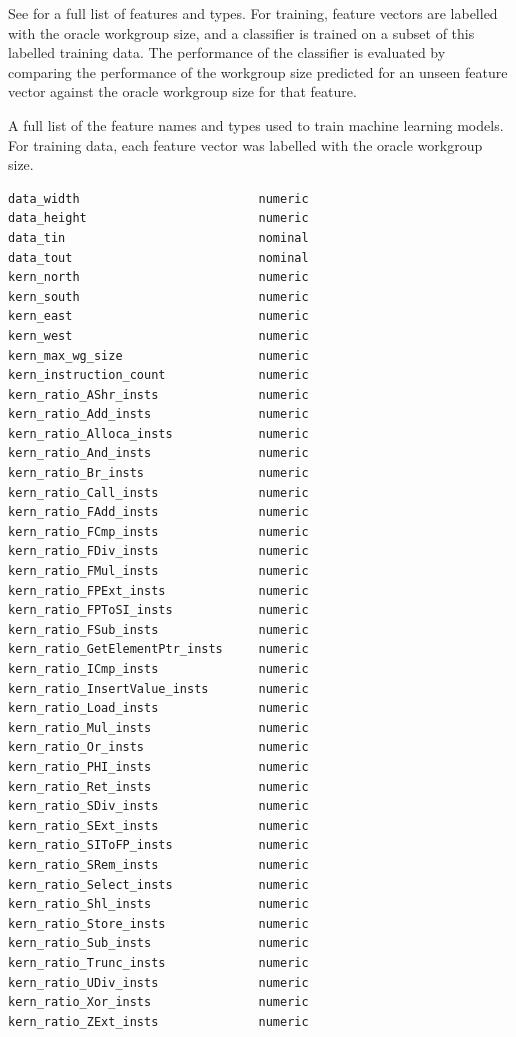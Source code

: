 See  for a full list of features and types. For
training, feature vectors are labelled with the oracle workgroup size,
and a classifier is trained on a subset of this labelled training
data. The performance of the classifier is evaluated by comparing the
performance of the workgroup size predicted for an unseen feature
vector against the oracle workgroup size for that feature.

A full list of the feature names and types used to train machine
learning models. For training data, each feature vector was labelled
with the oracle workgroup size.

\begin{multicols}{2}
\begin{Verbatim}[fontsize=\footnotesize]
data_width                         numeric
data_height                        numeric
data_tin                           nominal
data_tout                          nominal
kern_north                         numeric
kern_south                         numeric
kern_east                          numeric
kern_west                          numeric
kern_max_wg_size                   numeric
kern_instruction_count             numeric
kern_ratio_AShr_insts              numeric
kern_ratio_Add_insts               numeric
kern_ratio_Alloca_insts            numeric
kern_ratio_And_insts               numeric
kern_ratio_Br_insts                numeric
kern_ratio_Call_insts              numeric
kern_ratio_FAdd_insts              numeric
kern_ratio_FCmp_insts              numeric
kern_ratio_FDiv_insts              numeric
kern_ratio_FMul_insts              numeric
kern_ratio_FPExt_insts             numeric
kern_ratio_FPToSI_insts            numeric
kern_ratio_FSub_insts              numeric
kern_ratio_GetElementPtr_insts     numeric
kern_ratio_ICmp_insts              numeric
kern_ratio_InsertValue_insts       numeric
kern_ratio_Load_insts              numeric
kern_ratio_Mul_insts               numeric
kern_ratio_Or_insts                numeric
kern_ratio_PHI_insts               numeric
kern_ratio_Ret_insts               numeric
kern_ratio_SDiv_insts              numeric
kern_ratio_SExt_insts              numeric
kern_ratio_SIToFP_insts            numeric
kern_ratio_SRem_insts              numeric
kern_ratio_Select_insts            numeric
kern_ratio_Shl_insts               numeric
kern_ratio_Store_insts             numeric
kern_ratio_Sub_insts               numeric
kern_ratio_Trunc_insts             numeric
kern_ratio_UDiv_insts              numeric
kern_ratio_Xor_insts               numeric
kern_ratio_ZExt_insts              numeric

\end{Verbatim}
\end{multicols}
